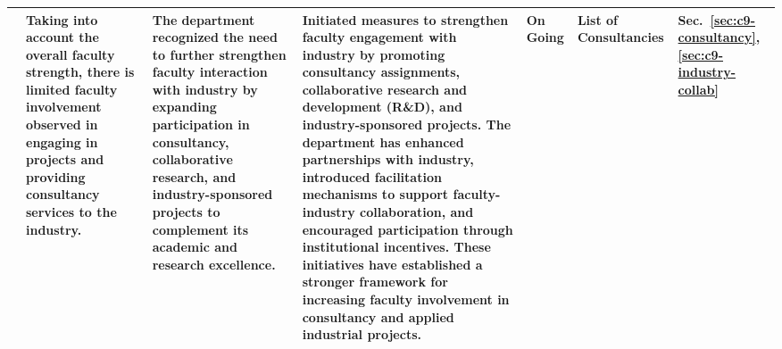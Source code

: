 \begin{landscape}
\begin{longtable}{|P{2.3cm}|P{5.0cm}|P{4.5cm}|P{5.0cm}|P{2.4cm}|P{2.8cm}|P{1.8cm}|}
 & Taking into account the overall faculty strength, there is limited faculty involvement observed in engaging in projects and providing consultancy services to the industry. & The department recognized the need to further strengthen faculty interaction with industry by expanding participation in consultancy, collaborative research, and industry-sponsored projects to complement its academic and research excellence. & Initiated measures to strengthen faculty engagement with industry by promoting consultancy assignments, collaborative research and development (R\&D), and industry-sponsored projects. The department has enhanced partnerships with industry, introduced facilitation mechanisms to support faculty-industry collaboration, and encouraged participation through institutional incentives. These initiatives have established a stronger framework for increasing faculty involvement in consultancy and applied industrial projects. & On Going & List of Consultancies & Sec.~\ref{sec:c9-consultancy}, \ref{sec:c9-industry-collab} \\ \hline
\end{longtable}
\end{landscape}

\label{annex:planner}




\label{annex:corrective}


\label{annex:wp2024}




